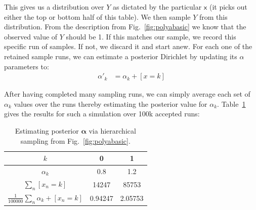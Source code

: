 \documentclass[oneside,english]{scrbook}
\begin{document}
This gives us a distribution over $Y$ as dictated by the particular
$\mathsf{x}$ (it picks out either the top or bottom half of this
table). We then sample $Y$ from this distribution.  From the
description from Fig.~\ref{fig:polyabasic} we know that the observed
value of $Y$ should be 1. If this matches our sample, we record this
specific run of samples. If not, we discard it and start anew. For each
one of the retained sample runs, we can estimate a posterior Dirichlet
by updating its $\alpha$ parameters to:
\begin{align*}
  \alpha'_k &= \alpha_k+[x=k]
\end{align*}

After having completed many sampling runs, we can simply average each
set of $\alpha_k$ values over the runs thereby estimating the
posterior value for $\alpha_k$. Table~\ref{tab:samplepolya} gives the results for such
a simulation over 100k accepted runs:
\begin{table}[!h]
\begin{center}
  \begin{tabular}{c | cc}
    $k$ & 0 & 1\\ \hline
    $\alpha_k$ & 0.8 & 1.2 \\
    $\sum_n[x_n=k]$ & 14247 & 85753 \\
    $\frac{1}{100000}\sum_n \alpha_k + [x_n=k]$ & 0.94247 & 2.05753
  \end{tabular}
\end{center}
\caption{Estimating posterior $\bm{\alpha}$ via hierarchical sampling from Fig.~\ref{fig:polyabasic}.  \label{tab:samplepolya} }
\end{table}
\end{document}
